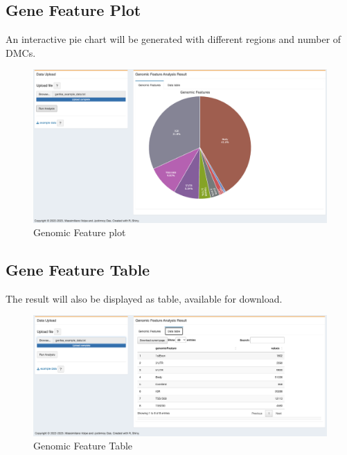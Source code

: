 \documentclass[
  a4paper,
  oneside,
  open=any]{scrreport}
\begin{document}
\hypertarget{gene-feature-plot}{%
\subsection{Gene Feature Plot}\label{gene-feature-plot}}

An interactive pie chart will be generated with different regions and
number of DMCs.\\

\begin{figure}[H]

{\centering \includegraphics{./_images/GeneFea1.png}

}

\caption{Genomic Feature plot}

\end{figure}

\hypertarget{gene-feature-table}{%
\subsection{Gene Feature Table}\label{gene-feature-table}}

The result will also be displayed as table, available for download.\\

\begin{figure}[H]

{\centering \includegraphics{./_images/GeneFea2.png}

}

\caption{Genomic Feature Table}

\end{figure}
\end{document}
